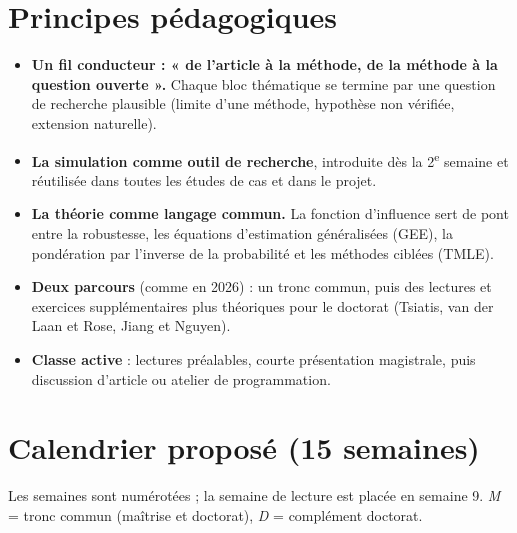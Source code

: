 \documentclass[11pt]{article}
\begin{document}
\section{Principes pédagogiques}

\begin{itemize}
  \item \textbf{Un fil conducteur : « de l'article à la méthode, de la méthode à la question
        ouverte ».} Chaque bloc thématique se termine par une question de recherche plausible
        (limite d'une méthode, hypothèse non vérifiée, extension naturelle).
  \item \textbf{La simulation comme outil de recherche}, introduite dès la 2\textsuperscript{e}
        semaine et réutilisée dans toutes les études de cas et dans le projet.
  \item \textbf{La théorie comme langage commun.} La fonction d'influence sert de pont entre la
        robustesse, les équations d'estimation généralisées (GEE), la pondération par
        l'inverse de la probabilité et les méthodes ciblées (TMLE).
  \item \textbf{Deux parcours} (comme en 2026) : un tronc commun, puis des lectures et exercices
        supplémentaires plus théoriques pour le doctorat (Tsiatis, van der Laan et Rose,
        Jiang et Nguyen).
  \item \textbf{Classe active} : lectures préalables, courte présentation magistrale,
        puis discussion d'article ou atelier de programmation.
\end{itemize}

\section{Calendrier proposé (15 semaines)}

Les semaines sont numérotées ; la semaine de lecture est placée en semaine 9.
\emph{M} = tronc commun (maîtrise et doctorat), \emph{D} = complément doctorat.
\end{document}
